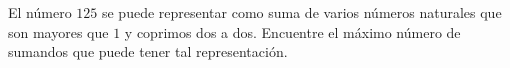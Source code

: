 El número $125$ se puede representar como suma de varios números naturales que son mayores que $1$ y coprimos dos a dos. Encuentre el máximo número de sumandos que puede tener tal representación.
